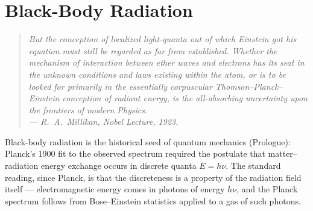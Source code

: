 \chapter{Black-Body Radiation}\label{ch:blackbody}


\begin{quote}
\itshape But the conception of localized light-quanta out of which Einstein got his equation must still be regarded as far from established. Whether the mechanism of interaction between ether waves and electrons has its seat in the unknown conditions and laws existing within the atom, or is to be looked for primarily in the essentially corpuscular Thomson--Planck--Einstein conception of radiant energy, is the all-absorbing uncertainty upon the frontiers of modern Physics.\\
\normalfont\hfill --- R.~A.~Millikan, Nobel Lecture, 1923.
\end{quote}
\bigskip

Black-body radiation is the historical seed of quantum mechanics (Prologue): Planck's 1900 fit to the observed spectrum required the postulate that matter--radiation energy exchange occurs in discrete quanta $E = h\nu$. The standard reading, since Planck, is that the discreteness is a property of the radiation field itself --- electromagnetic energy comes in photons of energy $h\nu$, and the Planck spectrum follows from Bose--Einstein statistics applied to a gas of such photons.

